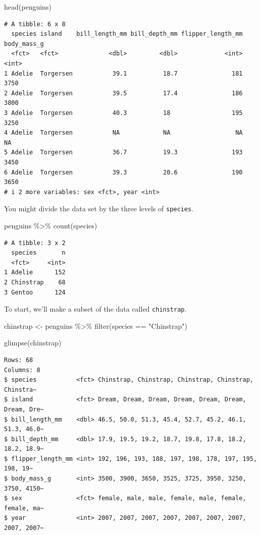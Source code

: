 \documentclass[
  letterpaper,
  DIV=11,
  numbers=noendperiod]{scrartcl}
\newenvironment{Shaded}{\begin{snugshade}}{\end{snugshade}}
\newcommand{\FunctionTok}[1]{\textcolor[rgb]{0.28,0.35,0.67}{#1}}
\newcommand{\NormalTok}[1]{\textcolor[rgb]{0.00,0.23,0.31}{#1}}
\newcommand{\OtherTok}[1]{\textcolor[rgb]{0.00,0.23,0.31}{#1}}
\newcommand{\SpecialCharTok}[1]{\textcolor[rgb]{0.37,0.37,0.37}{#1}}
\newcommand{\StringTok}[1]{\textcolor[rgb]{0.13,0.47,0.30}{#1}}
\begin{document}
\begin{Shaded}
\begin{Highlighting}[]
\FunctionTok{head}\NormalTok{(penguins)}
\end{Highlighting}
\end{Shaded}

\begin{verbatim}
# A tibble: 6 x 8
  species island    bill_length_mm bill_depth_mm flipper_length_mm body_mass_g
  <fct>   <fct>              <dbl>         <dbl>             <int>       <int>
1 Adelie  Torgersen           39.1          18.7               181        3750
2 Adelie  Torgersen           39.5          17.4               186        3800
3 Adelie  Torgersen           40.3          18                 195        3250
4 Adelie  Torgersen           NA            NA                  NA          NA
5 Adelie  Torgersen           36.7          19.3               193        3450
6 Adelie  Torgersen           39.3          20.6               190        3650
# i 2 more variables: sex <fct>, year <int>
\end{verbatim}

You might divide the data set by the three levels of \texttt{species}.

\begin{Shaded}
\begin{Highlighting}[]
\NormalTok{penguins }\SpecialCharTok{\%\textgreater{}\%} 
  \FunctionTok{count}\NormalTok{(species)}
\end{Highlighting}
\end{Shaded}

\begin{verbatim}
# A tibble: 3 x 2
  species       n
  <fct>     <int>
1 Adelie      152
2 Chinstrap    68
3 Gentoo      124
\end{verbatim}

To start, we'll make a subset of the data called \texttt{chinstrap}.

\begin{Shaded}
\begin{Highlighting}[]
\NormalTok{chinstrap }\OtherTok{\textless{}{-}}\NormalTok{ penguins }\SpecialCharTok{\%\textgreater{}\%} 
  \FunctionTok{filter}\NormalTok{(species }\SpecialCharTok{==} \StringTok{"Chinstrap"}\NormalTok{)}

\FunctionTok{glimpse}\NormalTok{(chinstrap)}
\end{Highlighting}
\end{Shaded}

\begin{verbatim}
Rows: 68
Columns: 8
$ species           <fct> Chinstrap, Chinstrap, Chinstrap, Chinstrap, Chinstra~
$ island            <fct> Dream, Dream, Dream, Dream, Dream, Dream, Dream, Dre~
$ bill_length_mm    <dbl> 46.5, 50.0, 51.3, 45.4, 52.7, 45.2, 46.1, 51.3, 46.0~
$ bill_depth_mm     <dbl> 17.9, 19.5, 19.2, 18.7, 19.8, 17.8, 18.2, 18.2, 18.9~
$ flipper_length_mm <int> 192, 196, 193, 188, 197, 198, 178, 197, 195, 198, 19~
$ body_mass_g       <int> 3500, 3900, 3650, 3525, 3725, 3950, 3250, 3750, 4150~
$ sex               <fct> female, male, male, female, male, female, female, ma~
$ year              <int> 2007, 2007, 2007, 2007, 2007, 2007, 2007, 2007, 2007~
\end{verbatim}
\end{document}
